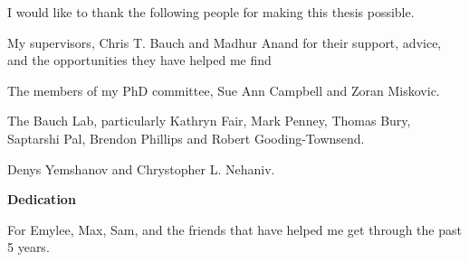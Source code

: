 I would like to thank the following people for making this thesis possible. 

My supervisors, Chris T. Bauch and Madhur Anand for their support, advice, and the opportunities they have helped me find

The members of my PhD committee, Sue Ann Campbell and Zoran Miskovic.

The Bauch Lab, particularly Kathryn Fair, Mark Penney, Thomas Bury, Saptarshi Pal, Brendon Phillips and Robert Gooding-Townsend.

Denys Yemshanov and Chrystopher L. Nehaniv.




\cleardoublepage


\begin{center}\textbf{Dedication}\end{center}

For Emylee, Max, Sam, and the friends that have helped me get through the past 5 years.


\cleardoublepage

\renewcommand\contentsname{Table of Contents}
\tableofcontents
\cleardoublepage
{}    %

\listoffigures
\cleardoublepage
{}		%

\listoftables
\cleardoublepage
{}		%



